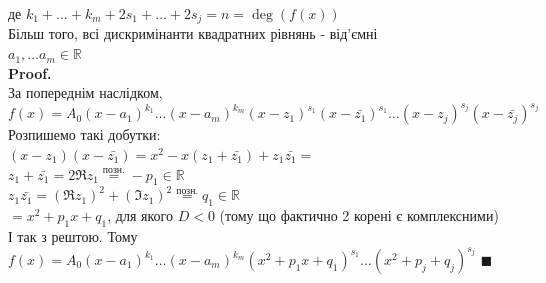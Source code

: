\documentclass[a4paper, 14pt]{extarticle}
\def\proof{\textbf{Proof.}\\}
\def\bigline{\vspace{5mm}\\}
\def\qed{$\blacksquare$}
\begin{document}
де $k_1 + \dots + k_m + 2s_1 + \dots + 2s_j = n = \deg(f(x))$\\
Більш того, всі дискримінанти квадратних рівнянь - від'ємні \\
$a_1, \dots a_m \in \mathbb{R}$\\
\proof
За попереднім наслідком,\\
$f(x) = A_0(x-a_1)^{k_1} \dots (x-a_m)^{k_m} (x-z_1)^{s_1} (x-\bar{z_1})^{s_1} \dots (x-z_j)^{s_j} (x-\bar{z_j})^{s_j}$\\
Розпишемо такі добутки:\\
$(x-z_1)(x-\bar{z_1}) = x^2 - x(z_1 +\bar{z_1}) + z_1 \bar{z_1} =$\\
$z_1 + \bar{z_1} = 2 \Re z_1 \overset{\textrm{позн.}}{=} -p_1 \in \mathbb{R}$\\
$z_1 \bar{z_1} = (\Re z_1)^2 + (\Im z_1)^2 \overset{\textrm{позн.}}{=} q_1 \in \mathbb{R}$\\
$= x^2 + p_1x + q_1$, для якого $D < 0$ (тому що фактично 2 корені є комплексними)\\
І так з рештою. Тому\\
$f(x) = A_0 (x-a_1)^{k_1} \dots (x-a_m)^{k_m} (x^2+p_1x+q_1)^{s_1} \dots (x^2+p_j+q_j)^{s_j}$ \qed
\bigline
\end{document}
